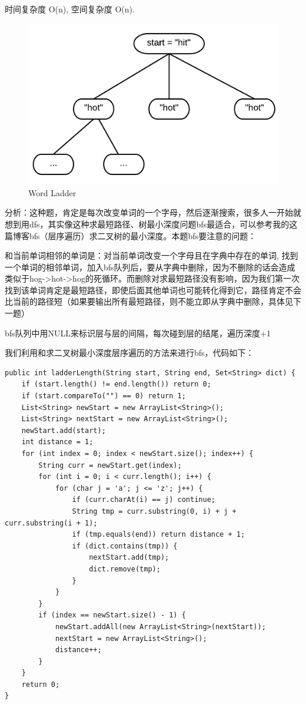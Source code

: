 \documentclass[12pt]{book}
\begin{document}
时间复杂度 O(n), 空间复杂度 O(n).

\begin{figure}[htb]
\centering
\includegraphics[width=.9\linewidth]{./pic/wordladder.png}
\caption{Word Ladder}
\end{figure}

分析：这种题，肯定是每次改变单词的一个字母，然后逐渐搜索，很多人一开始就想到用dfs，其实像这种求最短路径、树最小深度问题bfs最适合，可以参考我的这篇博客bfs（层序遍历）求二叉树的最小深度。本题bfs要注意的问题：

和当前单词相邻的单词是：对当前单词改变一个字母且在字典中存在的单词, 找到一个单词的相邻单词，加入bfs队列后，要从字典中删除，因为不删除的话会造成类似于hog->hot->hog的死循环。而删除对求最短路径没有影响，因为我们第一次找到该单词肯定是最短路径，即使后面其他单词也可能转化得到它，路径肯定不会比当前的路径短（如果要输出所有最短路径，则不能立即从字典中删除，具体见下一题）

bfs队列中用NULL来标识层与层的间隔，每次碰到层的结尾，遍历深度+1

我们利用和求二叉树最小深度层序遍历的方法来进行bfs，代码如下： 

\lstset{language=java,label= ,caption= ,numbers=none}
\begin{lstlisting}
public int ladderLength(String start, String end, Set<String> dict) {
    if (start.length() != end.length()) return 0;
    if (start.compareTo("") == 0) return 1;
    List<String> newStart = new ArrayList<String>();
    List<String> nextStart = new ArrayList<String>();
    newStart.add(start);
    int distance = 1;
    for (int index = 0; index < newStart.size(); index++) {
        String curr = newStart.get(index);
        for (int i = 0; i < curr.length(); i++) {
            for (char j = 'a'; j <= 'z'; j++) {
                if (curr.charAt(i) == j) continue;
                String tmp = curr.substring(0, i) + j + curr.substring(i + 1);
                if (tmp.equals(end)) return distance + 1;
                if (dict.contains(tmp)) {
                    nextStart.add(tmp);
                    dict.remove(tmp);
                }
            }
        }
        if (index == newStart.size() - 1) {
            newStart.addAll(new ArrayList<String>(nextStart));
            nextStart = new ArrayList<String>();
            distance++;
        }
    }
    return 0;
}
\end{lstlisting}
\end{document}
